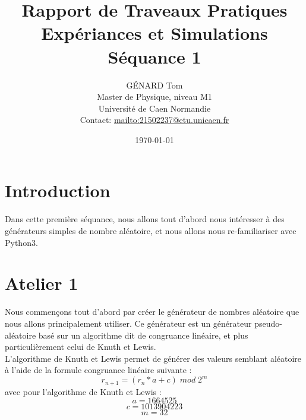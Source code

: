 \documentclass{article}
\title{Rapport de Traveaux Pratiques\\
  Exp\'{e}riances et Simulations\\
  S\'{e}quance 1}
\author{G\'{E}NARD Tom \\
  Master de Physique, niveau M1\\
  Universit\'{e} de Caen Normandie\\
  Contact: \url{mailto:21502237@etu.unicaen.fr}}
\date{\today}
\begin{document}
\maketitle
\vfill
\pagebreak

\tableofcontents
\vfill
\pagebreak

\section{Introduction}\label{section:intro}
Dans cette premi\`{e}re s\'{e}quance, nous allons tout d'abord nous intéresser à des générateurs simples de nombre aléatoire, et nous allons nous re-familiariser avec Python3.

\section{Atelier 1}\label{section:atelier1}
Nous commençons tout d'abord par créer le générateur de nombres aléatoire que nous allons principalement utiliser. Ce générateur est un générateur pseudo-aléatoire basé sur un algorithme dit de congruance linéaire, et plus particulièrement celui de Knuth et Lewis.\\
\newline
L'algorithme de Knuth et Lewis permet de générer des valeurs semblant aléatoire à l'aide de la formule congruance linéaire suivante :
\begin{equation}
  r_{n+1} = ( r_{n} * a + c ) \; mod \; 2^{m} \label{eq:ann:1}
\end{equation}
avec pour l'algorithme de Knuth et Lewis :
\begin{equation}
  a = 1664525
\end{equation}
\begin{equation}
  c = 1013904223
\end{equation}
\begin{equation}
  m = 32
\end{equation}
\end{document}
